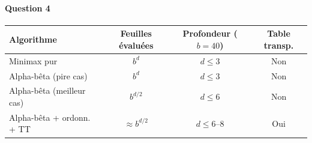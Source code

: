 \documentclass[a4paper,11pt]{article}
\begin{document}
\paragraph{Question 4}

\begin{center}
\renewcommand{\arraystretch}{1.4}
\begin{tabular}{lccc}
\toprule
\textbf{Algorithme} & \textbf{Feuilles évaluées} & \textbf{Profondeur ($b{=}40$)} & \textbf{Table transp.} \\
\midrule
Minimax pur                   & $b^d$              & $d \leq 3$    & Non \\
Alpha-bêta (pire cas)         & $b^d$              & $d \leq 3$    & Non \\
Alpha-bêta (meilleur cas)     & $b^{d/2}$          & $d \leq 6$    & Non \\
Alpha-bêta + ordonn. + TT     & $\approx b^{d/2}$  & $d \leq 6$--$8$ & Oui \\
\bottomrule
\end{tabular}
\end{center}
\end{document}
